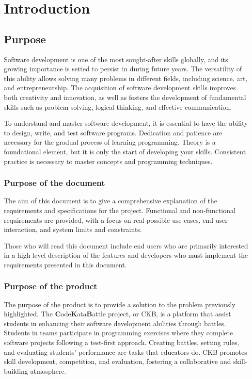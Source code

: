 \chapter{Introduction}

\section{Purpose}
Software development is one of the most sought-after skills globally, and its growing importance is setted to persist in during future years. 
The versatility of this ability allows solving many problems in different fields, including science, art, and entrepreneurship.
The acquisition of software development skills improves both creativity and innovation, as well as fosters the development of fundamental skills such as problem-solving, logical thinking, and effective communication. 

To understand and master software development, it is essential to have the ability to design, write, and test software programs.
Dedication and patience are necessary for the gradual process of learning programming.
Theory is a foundational element, but it is only the start of developing your skills. Consistent practice is necessary to master concepts and programming techniques.

\subsection{Purpose of the document}
The aim of this document is to give a comprehensive explanation of the requirements and specifications for the project.
Functional and non-functional requirements are provided, with a focus on real possible use cases, end user interaction, and system limits and constraints. 

Those who will read this document include end users who are primarily interested in a high-level description of the features 
and developers who must implement the requirements presented in this document.

\subsection{Purpose of the product}
The purpose of the product is to provide a solution to the problem previously highlighted.
The \textbf{C}ode\textbf{K}ata\textbf{B}attle project, or CKB, is a platform that assist students in enhancing their software development abilities through battles.
Students in teams participate in programming exercises where they complete software projects following a test-first approach.
Creating battles, setting rules, and evaluating students' performance are tasks that educators do.
CKB promotes skill development, competition, and evaluation, fostering a collaborative and skill-building atmosphere.

